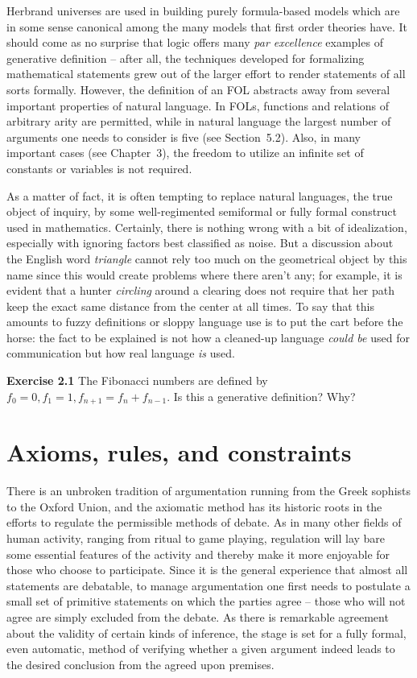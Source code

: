 \smallskip{} Herbrand universes are used in building
purely formula-based models which are in some sense canonical among the many
models that first order theories have. It should come as no surprise that
logic offers many {\it par excellence} examples of generative definition --
after all, the techniques developed for formalizing mathematical statements
grew out of the larger effort to render statements of all sorts
formally. However, the definition of an FOL abstracts away from several
important properties of natural language. In FOLs, functions and relations of
arbitrary arity are permitted, while in natural language the largest number of
arguments one needs to consider is five (see Section~5.2).  Also, in many
important cases (see Chapter~3), the freedom to utilize an infinite set of
constants or variables is not required.

As a matter of fact, it is often tempting to replace natural languages, the
true object of inquiry, by some well-regimented semiformal or fully formal
construct used in mathematics. Certainly, there is nothing wrong with a bit of
idealization, especially with ignoring factors best classified as noise. But a
discussion about the English word {\it triangle} cannot rely too much on the
geometrical object by this name since this would create problems where there
aren't any; for example, it is evident that a hunter {\it circling} around a
clearing does not require that her path keep the exact same distance from the
center at all times. To say that this amounts to fuzzy definitions or sloppy
language use is to put the cart before the horse: the fact to be explained is
not how a cleaned-up language {\it could be} used for communication but how
real language {\it is} used.

\smallskip\noindent
{\bf Exercise 2.1} The Fibonacci numbers are defined by $f_0=0, f_1=1,
f_{n+1}=f_n+f_{n-1}$. Is this a generative definition? Why?

\section{Axioms, rules, and constraints}

There is an unbroken tradition of argumentation running from the Greek
sophists to the Oxford Union, and the axiomatic method has its historic roots
in the efforts to regulate the permissible methods of debate. As in many other
fields of human activity, ranging from ritual to game playing, regulation will
lay bare some essential features of the activity and thereby make it more
enjoyable for those who choose to participate. Since it is the general
experience that almost all statements are debatable, to manage argumentation
one first needs to postulate a small set of primitive statements on which the
parties agree -- those who will not agree are simply excluded from the
debate. As there is remarkable agreement about the validity of certain kinds
of inference, the stage is set for a fully formal, even automatic, method of
verifying whether a given argument indeed leads to the desired conclusion from
the agreed upon premises. 

